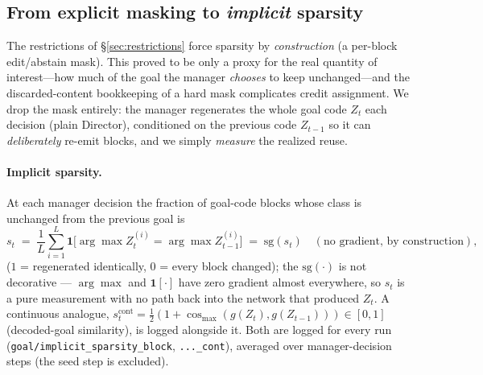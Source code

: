 \documentclass[10pt]{article}
\begin{document}
\subsection{From explicit masking to \emph{implicit} sparsity}
\label{sec:implicit}

The restrictions of \S\ref{sec:restrictions} force sparsity by \emph{construction}
(a per-block edit/abstain mask). This proved to be only a proxy for the real
quantity of interest---how much of the goal the manager \emph{chooses} to keep
unchanged---and the discarded-content bookkeeping of a hard mask complicates
credit assignment. We drop the mask entirely: the manager regenerates the whole
goal code $Z_t$ each decision (plain Director), conditioned on the previous code
$Z_{t-1}$ so it can \emph{deliberately} re-emit blocks, and we simply
\emph{measure} the realized reuse.

\paragraph{Implicit sparsity.} At each manager decision the fraction of
goal-code blocks whose class is unchanged from the previous goal is
\begin{equation}
s_t \;=\; \frac1L\sum_{i=1}^{L}\mathbf{1}\big[\arg\max Z_t^{(i)} = \arg\max Z_{t-1}^{(i)}\big]
\;=\; \mathrm{sg}(s_t)\quad(\text{no gradient, by construction}),
\label{eq:implicits}
\end{equation}
($1$ = regenerated identically, $0$ = every block changed); the $\mathrm{sg}(\cdot)$
is not decorative --- $\arg\max$ and $\mathbf{1}[\cdot]$ have zero gradient
almost everywhere, so $s_t$ is a pure measurement with no path back into the
network that produced $Z_t$. A continuous analogue,
$s^{\mathrm{cont}}_t = \tfrac12(1+\cos_{\max}(g(Z_t), g(Z_{t-1})))\in[0,1]$
(decoded-goal similarity), is logged alongside it. Both are logged for every
run (\texttt{goal/implicit\_sparsity\_block}, \texttt{...\_cont}), averaged
over manager-decision steps (the seed step is excluded).
\end{document}

